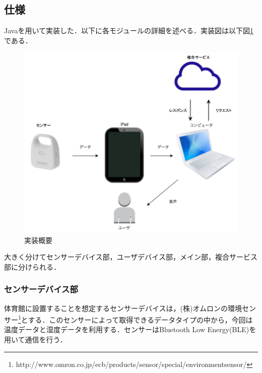 \documentclass{kuisthesis}			%
\begin{document}
\subsection{仕様}
Javaを用いて実装した．以下に各モジュールの詳細を述べる．実装図は以下図\ref{pic:system}である．
\begin{figure}[hb]
 \begin{center}
  \includegraphics[width=\linewidth]{pic/system.png}
  \caption{実装概要}
  \label{pic:system}
 \end{center}
\end{figure}
大きく分けてセンサーデバイス部，ユーザデバイス部，メイン部，複合サービス部に分けられる．

\subsubsection{センサーデバイス部}
体育館に設置することを想定するセンサーデバイスは，(株)オムロンの環境センサー\footnote{http://www.omron.co.jp/ecb/products/sensor/special/environmentsensor/}とする．このセンサーによって取得できるデータタイプの中から，今回は温度データと湿度データを利用する．センサーはBluetooth Low Energy(BLE)を用いて通信を行う．
\end{document}
